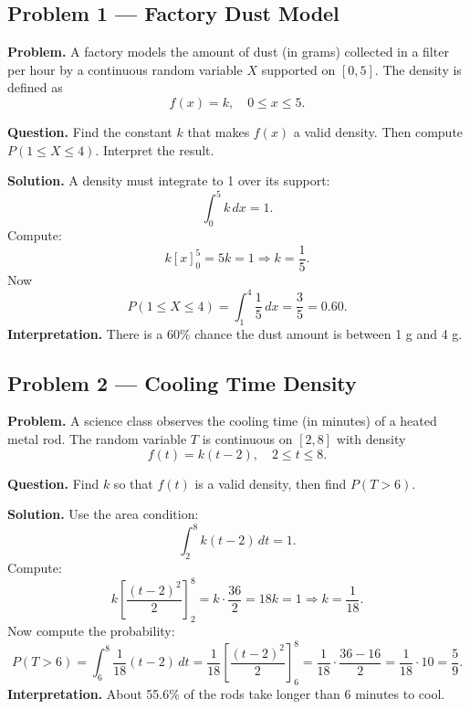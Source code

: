 	
	\begin{ExamProblems}
		
		\hypertarget{c1-ex1}{}
		\item
		\subsection*{Problem 1 — Factory Dust Model}
		
		\textbf{Problem.}
		A factory models the amount of dust (in grams) collected in a filter per hour by a continuous random variable
		\(X\) supported on \([0,5]\). The density is defined as
		\[
		f(x)=k,\quad 0\le x\le 5.
		\]
		
		\textbf{Question.} Find the constant \(k\) that makes \(f(x)\) a valid density. Then compute
		\(P(1\le X\le 4)\). Interpret the result.
		
		\textbf{Solution.}
		A density must integrate to 1 over its support:
		\[
		\int_0^{5} k\,dx=1.
		\]
		Compute:
		\[
		k[ x ]_0^{5}=5k=1\Rightarrow k=\frac{1}{5}.
		\]
		Now
		\[
		P(1\le X\le 4)=\int_1^4 \frac{1}{5}\,dx=\frac{3}{5}=0.60.
		\]
		\textbf{Interpretation.} There is a 60\% chance the dust amount is between 1 g and 4 g.
		
		
		\hypertarget{c1-ex2}{}
		\item
		\subsection*{Problem 2 — Cooling Time Density}
		
		\textbf{Problem.}
		A science class observes the cooling time (in minutes) of a heated metal rod. The random variable
		\(T\) is continuous on \([2, 8]\) with density
		\[
		f(t)=k(t-2),\quad 2\le t\le 8.
		\]
		
		\textbf{Question.} Find \(k\) so that \(f(t)\) is a valid density, then find \(P(T>6)\).
		
		\textbf{Solution.}
		Use the area condition:
		\[
		\int_2^8 k(t-2)\,dt=1.
		\]
		Compute:
		\[
		k\left[\frac{(t-2)^2}{2}\right]_2^8=k\cdot\frac{36}{2}=18k=1\Rightarrow k=\frac{1}{18}.
		\]
		Now compute the probability:
		\[
		P(T>6)=\int_6^8 \frac{1}{18}(t-2)\,dt=\frac{1}{18}\left[\frac{(t-2)^2}{2}\right]_6^8
		=\frac{1}{18}\cdot\frac{36-16}{2}=\frac{1}{18}\cdot 10=\frac{5}{9}.
		\]
		\textbf{Interpretation.} About 55.6\% of the rods take longer than 6 minutes to cool.
		

\end{ExamProblems}
